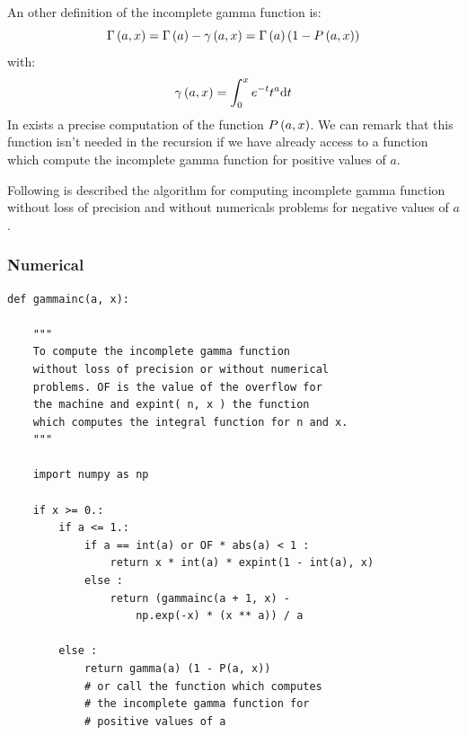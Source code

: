 An other definition of the incomplete gamma function is:
%
\begin{equation}
    \Gamma\left({a,x}\right)=\Gamma\left({a}\right)-\gamma\left({a,x}\right)=\Gamma\left({a}\right)\left({1-P\left({a,x}\right)}\right)
\end{equation}
%
with:
%
\begin{equation}
    \gamma\left({a,x}\right)=\int_0^x{e^{-t}{t^{a}}{\rm{d}}{t}}
\end{equation}
%
In \citet{NumericalRecipes} exists a precise computation of the function
$P\left({a,x}\right)$. We can remark that this function isn't needed in the recursion
if we have already access to a function which compute the incomplete gamma
function for positive values of $a$.

Following is described the algorithm for computing incomplete gamma function
without loss of precision and without numericals problems for negative values
of $a$.
%
\subsubsection{Numerical}
%
\begin{verbatim}
def gammainc(a, x):

    """
    To compute the incomplete gamma function
    without loss of precision or without numerical
    problems. OF is the value of the overflow for
    the machine and expint( n, x ) the function
    which computes the integral function for n and x.
    """

    import numpy as np

    if x >= 0.:
        if a <= 1.:
            if a == int(a) or OF * abs(a) < 1 :
                return x * int(a) * expint(1 - int(a), x)
            else :
                return (gammainc(a + 1, x) -
                    np.exp(-x) * (x ** a)) / a

        else :
            return gamma(a) (1 - P(a, x))
            # or call the function which computes
            # the incomplete gamma function for
            # positive values of a
\end{verbatim}
